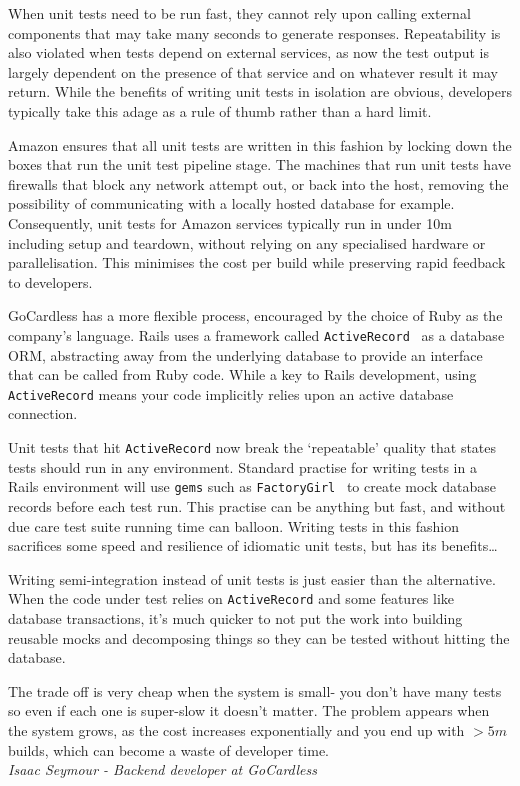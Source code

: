 \documentclass[11pt]{article}
\begin{document}
When unit tests need to be run fast, they cannot rely upon calling external
components that may take many seconds to generate responses. Repeatability is
also violated when tests depend on external services, as now the test output is
largely dependent on the presence of that service and on whatever result it may
return. While the benefits of writing unit tests in isolation are obvious,
developers typically take this adage as a rule of thumb rather than a hard
limit.

Amazon ensures that all unit tests are written in this fashion by locking down
the boxes that run the unit test pipeline stage. The machines that run unit
tests have firewalls that block any network attempt out, or back into the host,
removing the possibility of communicating with a locally hosted database for
example. Consequently, unit tests for Amazon services typically run in under 10m
including setup and teardown, without relying on any specialised hardware or
parallelisation. This minimises the cost per build while preserving rapid
feedback to developers.

GoCardless has a more flexible process, encouraged by the choice of Ruby as the
company's language. Rails uses a framework called
\texttt{ActiveRecord}~\cite{activeRecord} as a database ORM, abstracting away
from the underlying database to provide an interface that can be called from
Ruby code. While a key to Rails development, using \texttt{ActiveRecord} means
your code implicitly relies upon an active database connection.

Unit tests that hit \texttt{ActiveRecord} now break the `repeatable' quality
that states tests should run in any environment. Standard practise for writing
tests in a Rails environment will use \texttt{gems} such as
\texttt{FactoryGirl}~\cite{factoryGirl} to create mock database records before
each test run. This practise can be anything but fast, and without due care test
suite running time can balloon. Writing tests in this fashion sacrifices some
speed and resilience of idiomatic unit tests, but has its benefits\dots

\begin{displayquote}

  Writing semi-integration instead of unit tests is just easier than the
  alternative. When the code under test relies on \texttt{ActiveRecord} and some
  features like database transactions, it's much quicker to not put the work
  into building reusable mocks and decomposing things so they can be tested
  without hitting the database.

  The trade off is very cheap when the system is small- you don't have many
  tests so even if each one is super-slow it doesn't matter. The problem appears
  when the system grows, as the cost increases exponentially and you end up with
  $>5m$ builds, which can become a waste of developer time. \\

  \textit{Isaac Seymour - Backend developer at GoCardless}

\end{displayquote}
\end{document}
